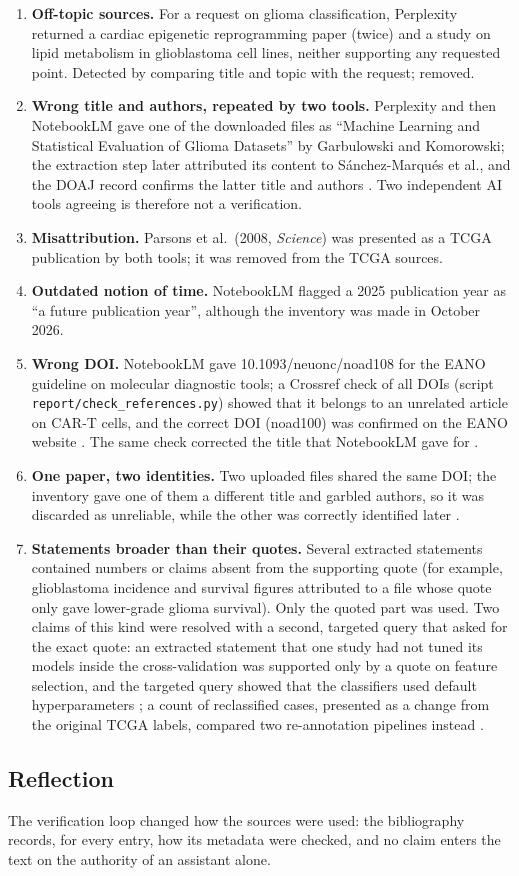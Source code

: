 \begin{enumerate}
  \item \textbf{Off-topic sources.} For a request on glioma classification, Perplexity returned a
        cardiac epigenetic reprogramming paper (twice) and a study on lipid metabolism in glioblastoma
        cell lines, neither supporting any requested point. Detected by comparing title and topic with
        the request; removed.
  \item \textbf{Wrong title and authors, repeated by two tools.} Perplexity and then NotebookLM gave
        one of the downloaded files as ``Machine Learning and Statistical Evaluation of Glioma
        Datasets'' by Garbulowski and Komorowski; the extraction step later attributed its content to
        Sánchez-Marqués et al., and the DOAJ record confirms the latter title and authors
        \cite{sanchezmarques2024}. Two independent AI tools agreeing is therefore not a verification.
  \item \textbf{Misattribution.} Parsons et al.\ (2008, \emph{Science}) was presented as a TCGA
        publication by both tools; it was removed from the TCGA sources.
  \item \textbf{Outdated notion of time.} NotebookLM flagged a 2025 publication year as ``a future
        publication year'', although the inventory was made in October 2026.
  \item \textbf{Wrong DOI.} NotebookLM gave 10.1093/neuonc/noad108 for the EANO guideline on molecular
        diagnostic tools; a Crossref check of all DOIs (script \texttt{report/check\_references.py})
        showed that it belongs to an unrelated article on CAR-T cells, and the correct DOI
        (noad100) was confirmed on the EANO website \cite{sahm2023}. The same check corrected the title
        that NotebookLM gave for \cite{varma2006}.
  \item \textbf{One paper, two identities.} Two uploaded files shared the same DOI; the inventory gave
        one of them a different title and garbled authors, so it was discarded as unreliable, while
        the other was correctly identified later \cite{leiriademendonca2025}.
  \item \textbf{Statements broader than their quotes.} Several extracted statements contained numbers
        or claims absent from the supporting quote (for example, glioblastoma incidence and survival
        figures attributed to a file whose quote only gave lower-grade glioma survival). Only the
        quoted part was used. Two claims of this kind were resolved with a second, targeted query
        that asked for the exact quote: an extracted statement that one study had not tuned its
        models inside the cross-validation was supported only by a quote on feature selection, and the
        targeted query showed that the classifiers used default hyperparameters \cite{tasci2022}; a
        count of reclassified cases, presented as a change from the original TCGA labels, compared
        two re-annotation pipelines instead \cite{leiriademendonca2025}.
\end{enumerate}

\subsection*{Reflection}

The verification loop changed how the sources were used: the bibliography records, for every entry,
how its metadata were checked, and no claim enters the text on the authority of an assistant alone.
